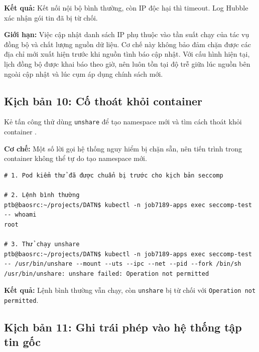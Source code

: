 \textbf{Kết quả:} Kết nối nội bộ bình thường, còn IP độc hại thì timeout. Log Hubble xác nhận gói tin đã bị từ chối.

\textbf{Giới hạn:} Việc cập nhật danh sách IP phụ thuộc vào tần suất chạy của tác vụ đồng bộ và chất lượng nguồn dữ liệu. Cơ chế này không bảo đảm chặn được các địa chỉ mới xuất hiện trước khi nguồn tình báo cập nhật. Với cấu hình hiện tại, lịch đồng bộ được khai báo theo giờ, nên luôn tồn tại độ trễ giữa lúc nguồn bên ngoài cập nhật và lúc cụm áp dụng chính sách mới.

\subsection{Kịch bản 10: Cố thoát khỏi container}
\label{subsec:c3_kb10}

Kẻ tấn công thử dùng \texttt{unshare} để tạo namespace mới và tìm cách thoát khỏi container \parencite{mitre_t1611}.

\textbf{Cơ chế:} Một số lời gọi hệ thống nguy hiểm bị chặn sẵn, nên tiến trình trong container không thể tự do tạo namespace mới.

\begin{listing}[H]
\begin{verbatim}
# 1. Pod kiểm thử đã được chuẩn bị trước cho kịch bản seccomp

# 2. Lệnh bình thường
ptb@baosrc:~/projects/DATN$ kubectl -n job7189-apps exec seccomp-test -- whoami
root

# 3. Thử chạy unshare
ptb@baosrc:~/projects/DATN$ kubectl -n job7189-apps exec seccomp-test -- /usr/bin/unshare --mount --uts --ipc --net --pid --fork /bin/sh
/usr/bin/unshare: unshare failed: Operation not permitted
\end{verbatim}
\caption{Seccomp từ chối lời gọi \texttt{unshare}}
\label{lst:c3_kb10}
\end{listing}

\textbf{Kết quả:} Lệnh bình thường vẫn chạy, còn \texttt{unshare} bị từ chối với \texttt{Operation not permitted}.

\subsection{Kịch bản 11: Ghi trái phép vào hệ thống tập tin gốc}
\label{subsec:c3_kb11}

